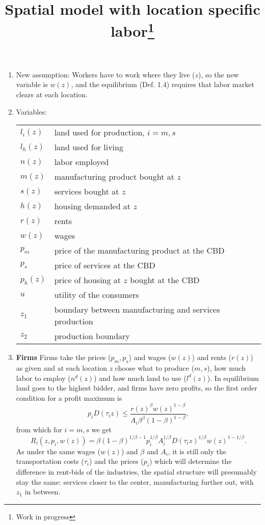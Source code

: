 \documentclass[10pt]{article}
\begin{document}
\title{Spatial model with location specific labor\thanks{Work in progress}}
\maketitle

\begin{enumerate}
\item New assumption: Workers have to work where they live ($z$), so the new variable is $w(z)$, and the equilibrium (Def. 1.4) requires that labor market clears at each location.
\item Variables:
\begin{table}[h!]
\center
\begin{tabular}{ll}
$l_i(z)$ & land used for production, $i=m,s$ \\
$l_h(z)$ & land used for living \\
$n(z)$ & labor employed\\
$m(z)$ & manufacturing product bought at $z$ \\
$s(z)$ & services bought at $z$ \\
$h(z)$ & housing demanded at $z$ \\
$r(z)$ & rents \\
$w(z)$ & wages \\
$p_m$ & price of the manufacturing product at the CBD \\
$p_s$ & price of services at the CBD \\
$p_h(z)$ & price of housing at $z$ bought at the CBD \\
$u$ & utility of the consumers\\
$z_1$ & boundary between manufacturing and services production \\
$z_2$ & production boundary \\
\end{tabular}
\end{table}

\item \textbf{Firms}
Firms take the prices ($p_m,p_s$) and wages ($w(z)$) and rents ($r(z)$) as given and at each location $z$ choose what to produce ($m,s$), how much labor to employ ($n^d(z)$) and how much land to use ($l^d(z)$). In equilibrium land goes to the highest bidder, and firms have zero profits, so the first order condition for a profit maximum is
\begin{equation*}
p_iD(\tau_iz)\leq \frac{r(z)^\beta w(z)^{1-\beta}}{A_i\beta^\beta(1-\beta)^{1-\beta}},
\end{equation*}
from which for $i=m,s$ we get
\begin{equation}\label{eq:bidrent:industry}
R_i(z,p_i,w(z)) = \beta (1-\beta)^{1/\beta-1} p_i^{1/\beta} A_i^{1/\beta} D(\tau_i z)^{1/\beta}w(z)^{1-1/\beta}.
\end{equation}
As under the same wages ($w(z)$) and $\beta$ and $A_i$, it is still only the transportation costs ($\tau_i$) and the prices ($p_i$) which will determine the difference in rent-bids of the industries, the spatial structure will presumably stay the same: services closer to the center, manufacturing further out, with $z_1$ in between.


\end{enumerate}
\end{document}
